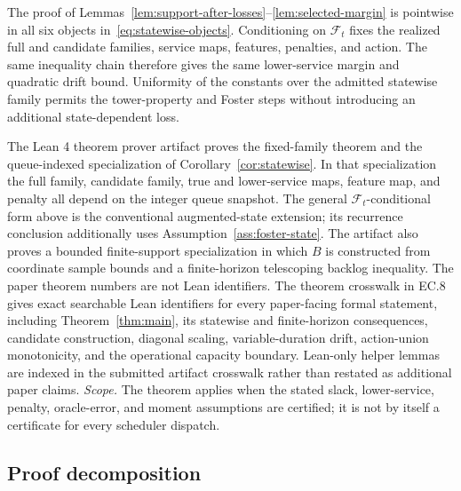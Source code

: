 \documentclass[opre,dblanonrev]{informs4}
\begin{document}
The proof of Lemmas~\ref{lem:support-after-losses}--\ref{lem:selected-margin}
is pointwise in all six objects in~\eqref{eq:statewise-objects}.  Conditioning
on \(\mathcal F_t\) fixes the realized full and candidate families, service
maps, features, penalties, and action.  The same inequality chain therefore
gives the same lower-service margin and quadratic drift bound.  Uniformity of
the constants over the admitted statewise family permits the tower-property
and Foster steps without introducing an additional state-dependent loss.
\endproof

\noindent
The Lean 4 theorem prover artifact \citep{deMoura2021lean} proves the
fixed-family theorem and the queue-indexed specialization of
Corollary~\ref{cor:statewise}.  In that specialization the full family,
candidate family, true and lower-service maps, feature map, and penalty all
depend on the integer queue snapshot.  The general \(\mathcal F_t\)-conditional
form above is the conventional augmented-state extension; its recurrence
conclusion additionally uses Assumption~\ref{ass:foster-state}.  The artifact
also proves a bounded finite-support specialization in which \(B\) is
constructed from coordinate sample bounds and a finite-horizon telescoping
backlog inequality.  The paper theorem numbers are not Lean identifiers.
The theorem crosswalk in EC.8 gives exact searchable Lean identifiers for every
paper-facing formal statement, including Theorem~\ref{thm:main}, its statewise
and finite-horizon consequences, candidate construction, diagonal scaling,
variable-duration drift, action-union monotonicity, and the operational
capacity boundary.  Lean-only helper lemmas are indexed in the submitted
artifact crosswalk rather than restated as additional paper claims.
\emph{Scope.}  The theorem applies when the stated slack, lower-service,
penalty, oracle-error, and moment assumptions are certified; it is not by itself
a certificate for every scheduler dispatch.

\subsection{Proof decomposition}
\label{subsec:proof-decomposition}
\end{document}
